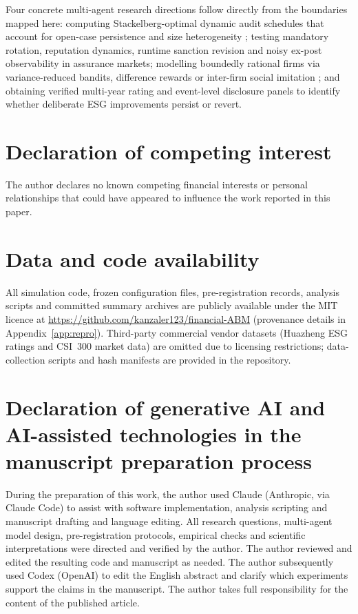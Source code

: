 \documentclass[11pt]{article}
\begin{document}
Four concrete multi-agent research directions follow directly from the boundaries mapped here: computing Stackelberg-optimal dynamic audit schedules that account for open-case persistence and size heterogeneity \citep{tambe2011security,blocki2015audit}; testing mandatory rotation, reputation dynamics, runtime sanction revision \citep{dellanna2020runtime} and noisy ex-post observability in assurance markets; modelling boundedly rational firms via variance-reduced bandits, difference rewards \citep{agogino2008analyzing} or inter-firm social imitation \citep{schlag1998imitate}; and obtaining verified multi-year rating and event-level disclosure panels to identify whether deliberate ESG improvements persist or revert.

\section*{Declaration of competing interest}
The author declares no known competing financial interests or personal relationships that could have appeared to influence the work reported in this paper.

\section*{Data and code availability}
All simulation code, frozen configuration files, pre-registration records, analysis scripts and committed summary archives are publicly available under the MIT licence at \url{https://github.com/kanzaler123/financial-ABM} (provenance details in Appendix~\ref{app:repro}). Third-party commercial vendor datasets (Huazheng ESG ratings and CSI~300 market data) are omitted due to licensing restrictions; data-collection scripts and hash manifests are provided in the repository.

\section*{Declaration of generative AI and AI-assisted technologies in the manuscript preparation process}
During the preparation of this work, the author used Claude (Anthropic, via Claude Code) to assist with software implementation, analysis scripting and manuscript drafting and language editing. All research questions, multi-agent model design, pre-registration protocols, empirical checks and scientific interpretations were directed and verified by the author. The author reviewed and edited the resulting code and manuscript as needed. The author subsequently used Codex (OpenAI) to edit the English abstract and clarify which experiments support the claims in the manuscript. The author takes full responsibility for the content of the published article.
\end{document}

